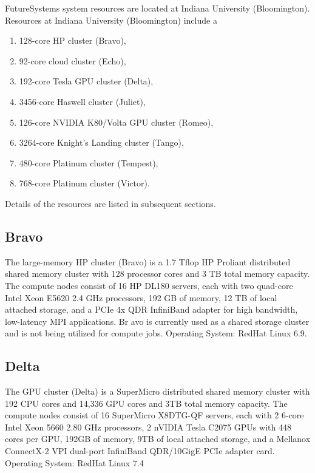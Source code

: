 FutureSystems system resources are located at Indiana University
(Bloomington). Resources at Indiana University (Bloomington) include a 

\begin{enumerate}
\item 128-core HP cluster (Bravo), 
\item 92-core cloud cluster (Echo), 
\item 192-core Tesla GPU cluster (Delta),
\item 3456-core Haswell cluster (Juliet), 
\item 126-core NVIDIA K80/Volta GPU cluster (Romeo), 
\item 3264-core Knight's Landing cluster (Tango), 
\item 480-core Platinum cluster (Tempest), 
\item 768-core Platinum cluster (Victor).
\end{enumerate}

Details of the resources are listed in subsequent sections. 

\subsection{Bravo}

The large-memory HP cluster (Bravo) is a 1.7 Tflop HP Proliant
distributed shared memory cluster with 128 processor cores and 3 TB
total memory capacity. The compute nodes consist of 16 HP DL180
servers, each with two quad-core Intel Xeon E5620 2.4 GHz processors,
192 GB of memory, 12 TB of local attached storage, and a PCIe 4x QDR
InfiniBand adapter for high bandwidth, low-latency MPI
applications. Br avo is currently used as a shared storage cluster and
is not being utilized for compute jobs. Operating System: RedHat Linux
6.9.

\subsection{Delta}

The GPU cluster (Delta) is a SuperMicro distributed shared memory
cluster with 192 CPU cores and 14,336 GPU cores and 3TB total memory
capacity. The compute nodes consist of 16 SuperMicro X8DTG-QF servers,
each with 2 6-core Intel Xeon 5660 2.80 GHz processors, 2 nVIDIA Tesla
C2075 GPUs with 448 cores per GPU, 192GB of memory, 9TB of local
attached storage, and a Mellanox ConnectX-2 VPI dual-port InfiniBand
QDR/10GigE PCIe adapter card. Operating System: RedHat Linux 7.4

